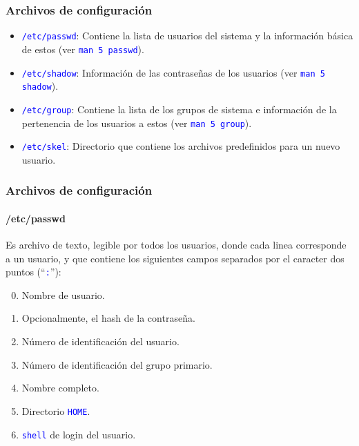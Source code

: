 \documentclass[11pt,a4paper,spanish]{beamer}
\newcommand{\codeword}[1]{\mbox{\texttt{\textcolor{blue}{#1}}}}
\begin{document}
\begin{frame}

    \frametitle{Archivos de configuración}

    \begin{itemize}
        \item \codeword{/etc/passwd}: Contiene la lista de usuarios del sistema y la
            información básica de estos (ver \codeword{man 5 passwd}).
        \item \codeword{/etc/shadow}: Información de las contraseñas de los
            usuarios (ver \codeword{man 5 shadow}).
        \item \codeword{/etc/group}: Contiene la lista de los grupos de
            sistema e información de la pertenencia de los usuarios a estos
            (ver \codeword{man 5 group}).
        \item \codeword{/etc/skel}: Directorio que contiene los archivos
            predefinidos para un nuevo usuario.
    \end{itemize}

\end{frame}

\begin{frame}

    \frametitle{Archivos de configuración}
    \framesubtitle{/etc/passwd}

    Es archivo de texto, legible por todos los usuarios, donde cada linea
    corresponde a un usuario, y que contiene los siguientes campos separados
    por el caracter dos puntos (``\codeword{:}''):

    \begin{enumerate}
        \setcounter{enumi}{-1}
        \item Nombre de usuario.
        \item Opcionalmente, el hash de la contraseña.
        \item Número de identificación del usuario.
        \item Número de identificación del grupo primario.
        \item Nombre completo.
        \item Directorio \codeword{HOME}.
        \item \codeword{shell} de login del usuario.
    \end{enumerate}

\end{frame}
\end{document}
